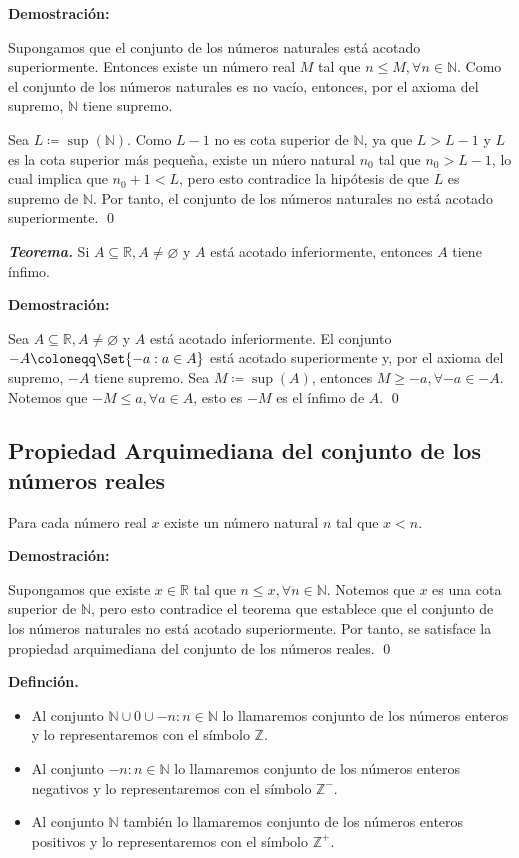 \documentclass[11pt]{article}
\newcommand{\N}{\mathbb{N}}
\newcommand{\Z}{\mathbb{Z}}
\newcommand{\R}{\mathbb{R}}
\let\emptyset\varnothing
\let\set\Set
\begin{document}
\textbf{Demostración:}

Supongamos que el conjunto de los números naturales está acotado superiormente. Entonces existe un número real $M$ tal que $n\leq M, \forall n\in \N$. Como el conjunto de los números naturales es no vacío, entonces, por el axioma del supremo, $\N$ tiene supremo.

Sea $L\coloneqq \sup{(\N)}$. Como $L-1$ no es cota superior de $\N$, ya que $L>L-1$ y $L$ es la cota superior más pequeña, existe un núero natural $n_0$ tal que $n_0>L-1$, lo cual implica que $n_0+1<L$, pero esto contradice la hipótesis	de que $L$ es supremo de $\N$. Por tanto, el conjunto de los números naturales no está acotado superiormente. \qed

\textbf{\textit{Teorema.}} Si $A\subseteq \R, A\neq \emptyset$ y $A$ está acotado inferiormente, entonces $A$ tiene ínfimo.

\textbf{Demostración:}

Sea $A\subseteq \R, A\neq \emptyset$ y $A$ está acotado inferiormente. El conjunto $-A \coloneqq \set{-a: a\in A}$ está acotado superiormente y, por el axioma del supremo, $-A$ tiene supremo. Sea $M\coloneqq \sup{(A)}$, entonces $M\geq -a, \forall -a\in -A$. Notemos que $-M\leq a, \forall a\in A$, esto es $-M$ es el ínfimo de $A$. \qed

\subsection*{Propiedad Arquimediana del conjunto de los números reales}

Para cada número real $x$ existe un número natural $n$ tal que $x<n$.

\textbf{Demostración:}

Supongamos que existe $x\in \R$ tal que $n\leq x, \forall n\in \N$. Notemos que $x$ es una cota superior de $\N$, pero esto contradice el teorema que establece que el conjunto de los números naturales no está acotado superiormente. Por tanto, se satisface la propiedad arquimediana del conjunto de los números reales. \qed

\textbf{Definción.} \begin{itemize}
    \item Al conjunto $\N \cup {0} \cup {-n: n\in \N}$ lo llamaremos conjunto de los números enteros y lo representaremos con el símbolo $\Z$.
    \item Al conjunto ${-n: n\in \N}$ lo llamaremos conjunto de los números enteros negativos y lo representaremos con el símbolo $\Z^-$.
    \item Al conjunto $\N$ también lo llamaremos conjunto de los números enteros positivos y lo representaremos con el símbolo $\Z^+$.
\end{itemize}
\end{document}
